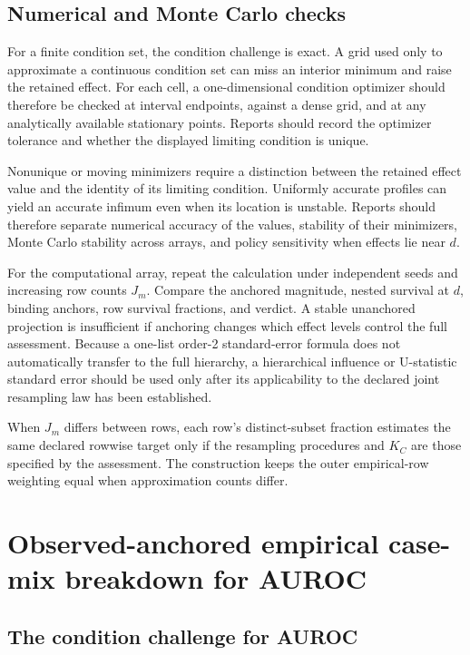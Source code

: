 \documentclass[11pt]{article}
\theoremstyle{remark}
\begin{document}
\subsection{Numerical and Monte Carlo checks}

For a finite condition set, the condition challenge is exact. A grid used only
to approximate a continuous condition set can miss an interior minimum and
raise the retained effect. For each cell, a one-dimensional condition optimizer
should therefore be checked at interval endpoints, against a dense grid, and
at any analytically available stationary points. Reports should record the
optimizer tolerance and whether the displayed limiting condition is unique.

Nonunique or moving minimizers require a distinction between the retained
effect value and the identity of its limiting condition. Uniformly accurate
profiles can yield an accurate infimum even when its location is unstable.
Reports should therefore separate numerical accuracy of the values, stability
of their minimizers, Monte Carlo stability across arrays, and policy
sensitivity when effects lie near $d$.

For the computational array, repeat the calculation under independent seeds
and increasing row counts $J_m$. Compare the anchored magnitude, nested
survival at $d$, binding anchors, row survival fractions, and verdict. A stable
unanchored projection is insufficient if anchoring changes which effect levels
control the full assessment. Because a one-list order-2 standard-error formula
does not automatically transfer to the full hierarchy, a hierarchical
influence or U-statistic standard error should be used only after its
applicability to the declared joint resampling law has been established.

When $J_m$ differs between rows, each row's distinct-subset fraction estimates
the same declared rowwise target only if the resampling procedures and $K_C$
are those specified by the assessment. The construction keeps the outer
empirical-row weighting equal when approximation counts differ.


\section{Observed-anchored empirical case-mix breakdown for AUROC}
\label{app:auroc}

\subsection{The condition challenge for AUROC}
\end{document}
